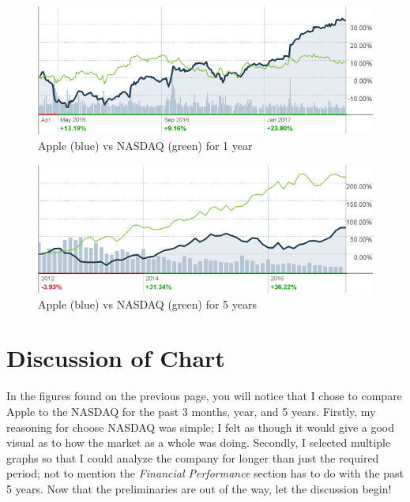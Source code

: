 \documentclass[12pt,a4paper,titlepage]{article}
\begin{document}
\begin{figure}[!htb]
  \centering
  \includegraphics[width=1\textwidth]{apple-chart-1yr}
    \caption{Apple (blue) vs NASDAQ (green) for 1 year~\cite{cnnapple}}
\end{figure}

\begin{figure}[!htb]
  \centering
  \includegraphics[width=1\textwidth]{apple-chart-5yr}
    \caption{Apple (blue) vs NASDAQ (green) for 5 years~\cite{cnnapple}}
\end{figure}

\newpage

\section{Discussion of Chart}
In the figures found on the previous page, you will notice that I chose to
compare Apple to the NASDAQ for the past 3 months, year, and 5 years. Firstly,
my reasoning for choose NASDAQ was simple; I felt as though it would give a
good visual as to how the market as a whole was doing. Secondly, I selected
multiple graphs so that I could analyze the company for longer than just the
required period; not to mention the \emph{Financial Performance} section has to
do with the past 5 years. Now that the preliminaries are out of the way, let the
discussion begin!
\end{document}
